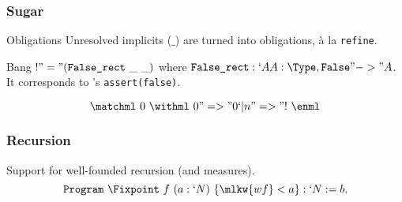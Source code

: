 \begin{frame}[t]

\end{frame}

\begin{frame}
  \frametitle{Sugar}

  \begin{block}{Obligations}
    Unresolved implicits ($\_$) are turned into obligations, \`a la \alert{\texttt{refine}}.
  \end{block}
  
  \begin{block}{Bang}
    $! "=" (\texttt{False\_rect}~\_~\_)$ where {\small $\texttt{False\_rect} : `A
    A : \Type, \texttt{False} "->" A$}. It corresponds to \ML's
    \texttt{assert(false)}.
  \end{block}
  
  \[\matchml~0~\withml~0 "=>" 0 `| n "=>" !~\enml\]
  

\end{frame}

\begin{frame}
  \frametitle{Recursion}

  Support for well-founded recursion (and measures).
  \[ \texttt{Program}~\Fixpoint~f~(a : `N)~\{ \mlkw{wf} < a \} : `N := b. \]
  
\end{frame}

